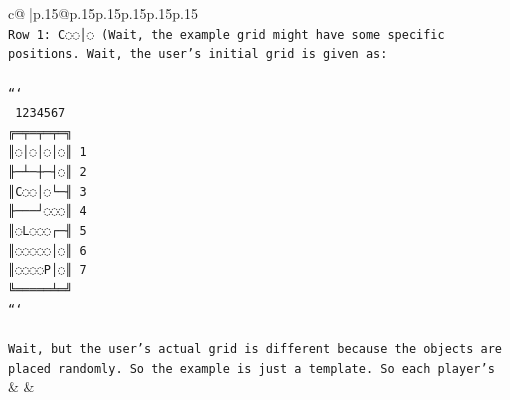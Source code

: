 \documentclass{article}
\begin{document}
{\begin{supertabular}{c@{$\;$}|p{.15\linewidth}@{}p{.15\linewidth}p{.15\linewidth}p{.15\linewidth}p{.15\linewidth}p{.15\linewidth}}
{{{\\ 
\texttt{Row 1: C◌◌│◌ (Wait, the example grid might have some specific positions. Wait, the user's initial grid is given as:} \\
\\ 
\texttt{```} \\
\texttt{ 1234567} \\
\texttt{╔═╤═╤═╤═╗} \\
\texttt{║◌│◌│◌│◌║ 1} \\
\texttt{╟─┴─┼─┤◌║ 2} \\
\texttt{║C◌◌│◌└─╢ 3} \\
\texttt{╟───┘◌◌◌║ 4} \\
\texttt{║◌L◌◌◌┌─╢ 5} \\
\texttt{║◌◌◌◌◌│◌║ 6} \\
\texttt{║◌◌◌◌P│◌║ 7} \\
\texttt{╚═════╧═╝} \\
\texttt{```} \\
\\ 
\texttt{Wait, but the user's actual grid is different because the objects are placed randomly. So the example is just a template. So each player's} \\
            }
        }
    }
    & & \\ \\


\end{supertabular}}
\end{document}
